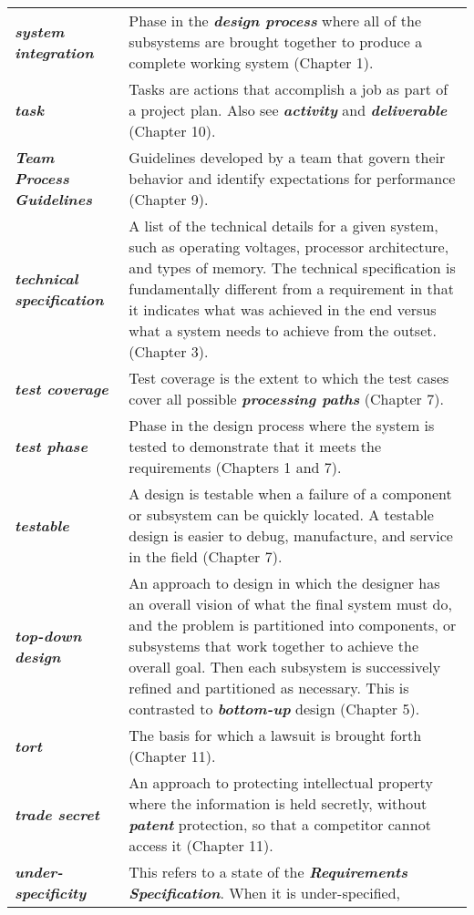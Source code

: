 \begin{longtable}[]{@{}
  >{\raggedright\arraybackslash}p{}
  >{\raggedright\arraybackslash}p{}@{}}
\emph{\textbf{system integration}} & Phase in the \emph{\textbf{design
process}} where all of the subsystems are brought together to produce a
complete working system (Chapter 1). \\
\emph{\textbf{task}} & Tasks are actions that accomplish a job as part
of a project plan. Also see \emph{\textbf{activity}} and
\emph{\textbf{deliverable}} (Chapter 10). \\
\emph{\textbf{Team Process Guidelines}} & Guidelines developed by a team
that govern their behavior and identify expectations for performance
(Chapter 9). \\
\emph{\textbf{technical specification}} & A list of the technical
details for a given system, such as operating voltages, processor
architecture, and types of memory. The technical specification is
fundamentally different from a requirement in that it indicates what was
achieved in the end versus what a system needs to achieve from the
outset. (Chapter 3). \\
\emph{\textbf{test coverage}} & Test coverage is the extent to which the
test cases cover all possible \emph{\textbf{processing paths}} (Chapter
7). \\
\emph{\textbf{test phase}} & Phase in the design process where the
system is tested to demonstrate that it meets the requirements (Chapters
1 and 7). \\
\emph{\textbf{testable}} & A design is testable when a failure of a
component or subsystem can be quickly located. A testable design is
easier to debug, manufacture, and service in the field (Chapter 7). \\
\emph{\textbf{top-down design}} & An approach to design in which the
designer has an overall vision of what the final system must do, and the
problem is parti­tioned into components, or subsystems that work together
to achieve the overall goal. Then each subsystem is successively refined
and partitioned as necessary. This is contrasted to
\emph{\textbf{bottom-up}} design (Chapter 5). \\
\emph{\textbf{tort}} & The basis for which a lawsuit is brought forth
(Chapter 11). \\
\emph{\textbf{trade secret}} & An approach to protecting intellectual
property where the information is held secretly, without
\emph{\textbf{patent}} protection, so that a competitor cannot access it
(Chapter 11). \\
\emph{\textbf{under-specificity}} & This refers to a state of the
\emph{\textbf{Requirements Specification}}. When it is under-specified,

\end{longtable}
